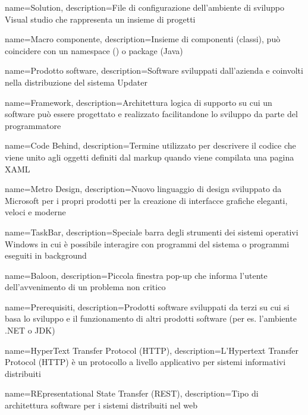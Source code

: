 
{
	name=Solution,
	description={File di configurazione dell'ambiente di sviluppo Visual studio che rappresenta un insieme di progetti}
}

{
	name=Macro componente,
	description={Insieme di componenti (classi), può coincidere con un namespace (\Csharp) o package (Java)}
}

{
	name=Prodotto software,
	description={Software sviluppati dall'azienda e coinvolti nella distribuzione del sistema Updater}
}

{
	name=Framework,
	description={Architettura logica di supporto su cui un software può essere progettato e realizzato facilitandone lo sviluppo da parte del programmatore}
}

{
	name=Code Behind,
	description={Termine utilizzato per descrivere il codice che viene unito agli oggetti definiti dal markup quando viene compilata una pagina XAML}
}

{
	name=Metro Design,
	description={Nuovo linguaggio di design sviluppato da Microsoft per i propri prodotti per la creazione di interfacce grafiche eleganti, veloci e moderne}
}

{
	name=TaskBar,
	description={Speciale barra degli strumenti dei sistemi operativi Windows in cui è possibile interagire con programmi del sistema o programmi eseguiti in background}
}

{
	name=Baloon,
	description={Piccola finestra pop-up che informa l'utente dell'avvenimento di un problema non critico}
}

{
	name=Prerequisiti,
	description={Prodotti software sviluppati da terzi su cui si basa lo sviluppo e il funzionamento di altri prodotti software (per es. l'ambiente .NET o JDK)}
}

{
	name=HyperText Transfer Protocol (HTTP),
	description={L'Hypertext Transfer Protocol (HTTP) è un protocollo a livello applicativo per sistemi informativi distribuiti}
}

{
	name=REpresentational State Transfer (REST),
	description={Tipo di architettura software per i sistemi distribuiti nel web}
}


